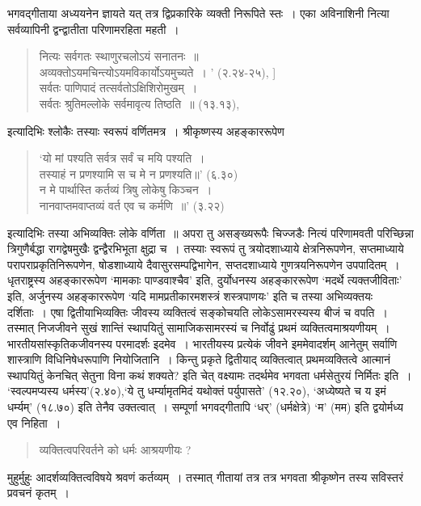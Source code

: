 {भगवद्गीताया अध्ययनेन ज्ञायते यत् तत्र द्विप्रकारिके व्यक्ती निरूपिते स्तः~। एका अविनाशिनी नित्या सर्वव्यापिनी द्वन्द्वातीता परिणामरहिता महती~। 
\begin{verse}
नित्यः सर्वगतः स्थाणुरचलोऽयं सनातनः~॥ \\
अव्यक्तोऽयमचिन्त्योऽयमविकार्योऽयमुच्यते~। ' (२.२४-२५), ]\\
सर्वतः पाणिपादं तत्सर्वतोऽक्षिशिरोमुखम्~। \\
सर्वतः श्रुतिमल्लोके सर्वमावृत्य तिष्ठति~॥ (१३.१३), 
\end{verse}
इत्यादिभिः श्लोकैः तस्याः स्वरूपं वर्णितमत्र~। श्रीकृष्णस्य अहङ्काररूपेण 
\begin{verse}
‘यो मां पश्यति सर्वत्र सर्वं च मयि पश्यति~। \\
तस्याहं न प्रणश्यामि स च मे न प्रणश्यति॥' (६.३०)\\
न मे पार्थास्ति कर्तव्यं त्रिषु लोकेषु किञ्चन~। \\
नानवाप्तमवाप्तव्यं वर्त एव च कर्मणि~॥' (३.२२) 
\end{verse}
इत्यादिभिः तस्या अभिव्यक्तिः लोके वर्णिता~॥ अपरा तु असङ्ख्यरूपैः चिज्जडैः नित्यं परिणामवती परिच्छिन्ना त्रिगुणैर्बद्धा रागद्वेषमुखैः द्वन्द्वैरभिभूता क्षुद्रा च~। तस्याः स्वरूपं तु त्रयोदशाध्याये क्षेत्रनिरूपणेन, सप्तमाध्याये परापराप्रकृतिनिरूपणेन, षोडशाध्याये दैवासुरसम्पद्विभागेन, सप्तदशाध्याये गुणत्रयनिरूपणेन उपपादितम्~। धृतराष्ट्रस्य अहङ्काररूपेण ‘मामकाः पाण्डवाश्चैव' इति, दुर्योधनस्य अहङ्काररूपेण ‘मदर्थे त्यक्तजीविताः' इति, अर्जुनस्य अहङ्काररूपेण ‘यदि मामप्रतीकारमशस्त्रं शस्त्रपाणयः' इति च तस्या अभिव्यक्तयः दर्शिताः~। एषा द्वितीयाभिव्यक्तिः जीवस्य व्यक्तित्वं सङ्कोचयति लोकेऽसामरस्यस्य बीजं च वपति~। तस्मात् निजजीवने सुखं शान्तिं स्थापयितुं सामाजिकसामरस्यं च निर्वोढुं प्रथमं व्यक्तित्वमाश्रयणीयम्~। भारतीयसांस्कृतिकजीवनस्य परमादर्शः इदमेव~। भारतीयस्य प्रत्येकं जीवने इममेवादर्शम् आनेतुम् सर्वाणि शास्त्राणि विधिनिषेधरूपाणि नियोजितानि~। किन्तु प्रकृते द्वितीयाद् व्यक्तित्वात् प्रथमव्यक्तित्वे आत्मानं स्थापयितुं केनचित् सेतुना विना कथं शक्यते? इति चेत् वक्ष्यामः तदर्थमेव भगवता धर्मसेतुरयं निर्मितः इति~। ‘स्वल्पमप्यस्य धर्मस्य'(२.४०),‘ये तु धर्म्यामृतमिदं यथोक्तं पर्युपासते' (१२.२०), ‘अध्येष्यते च य इमं धर्म्यम्' (१८.७०) इति तेनैव उक्तत्वात्~। सम्पूर्णा भगवद्गीतापि ‘धर्' (धर्मक्षेत्रे) ‘म' (मम) इति द्वयोर्मध्य एव निहिता~। 
\begin{verse}
व्यक्तित्वपरिवर्तने को धर्मः आश्रयणीयः ?
\end{verse}
मुहुर्मुहुः आदर्शव्यक्तित्वविषये श्रवणं कर्तव्यम्~। तस्मात् गीतायां तत्र तत्र भगवता श्रीकृष्णेन तस्य सविस्तरं प्रवचनं कृतम्~। 
\begin{verse}

\end{verse}}
